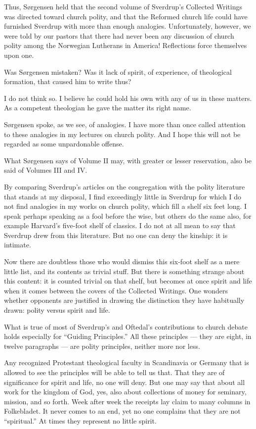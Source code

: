 Thus, Sørgensen held that the second volume of Sverdrup’s Collected Writings was directed toward church polity, and that the Reformed church life could have furnished Sverdrup with more than enough analogies. Unfortunately, however, we were told by our pastors that there had never been any discussion of church polity among the Norwegian Lutherans in America! Reflections force themselves upon one.

Was Sørgensen mistaken? Was it lack of spirit, of experience, of theological formation, that caused him to write thus?

I do not think so. I believe he could hold his own with any of us in these matters. As a competent theologian he gave the matter its right name.

Sørgensen spoke, as we see, of analogies. I have more than once called attention to these analogies in my lectures on church polity. And I hope this will not be regarded as some unpardonable offense.

What Sørgensen says of Volume II may, with greater or lesser reservation, also be said of Volumes III and IV.

By comparing Sverdrup’s articles on the congregation with the polity literature that stands at my disposal, I find exceedingly little in Sverdrup for which I do not find analogies in my works on church polity, which fill a shelf six feet long. I speak perhaps speaking as a fool before the wise, but others do the same also, for example Harvard’s five-foot shelf of classics. I do not at all mean to say that Sverdrup drew from this literature. But no one can deny the kinship: it is intimate.

Now there are doubtless those who would dismiss this six-foot shelf as a mere little list, and its contents as trivial stuff. But there is something strange about this content: it is counted trivial on that shelf, but becomes at once spirit and life when it comes between the covers of the Collected Writings. One wonders whether opponents are justified in drawing the distinction they have habitually drawn: polity versus spirit and life.

What is true of most of Sverdrup’s and Oftedal’s contributions to church debate holds especially for “Guiding Principles.” All these principles — they are eight, in twelve paragraphs — are polity principles, neither more nor less.

Any recognized Protestant theological faculty in Scandinavia or Germany that is allowed to see the principles will be able to tell us that. That they are of significance for spirit and life, no one will deny. But one may say that about all work for the kingdom of God, yes, also about collections of money for seminary, mission, and so forth. Week after week the receipts lay claim to many columns in Folkebladet. It never comes to an end, yet no one complains that they are not “spiritual.” At times they represent no little spirit.

